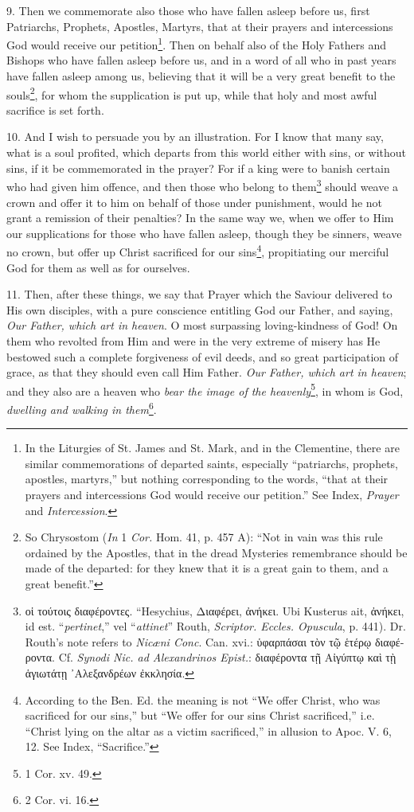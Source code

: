 9. Then we commemorate also those who have fallen asleep before us, first Patriarchs, Prophets, Apostles, Martyrs, that at their prayers and intercessions God would receive our petition\footnote{In the Liturgies of St. James and St. Mark, and in the Clementine, there are similar commemorations of departed saints, especially “patriarchs, prophets, apostles, martyrs,” but nothing corresponding to the words, “that at their prayers and intercessions God would receive our petition.” See Index, \emph{Prayer} and \emph{Intercession}.}. Then on behalf also of the Holy Fathers and Bishops who have fallen asleep before us, and in a word of all who in past years have fallen asleep among us, believing that it will be a very great benefit to the souls\footnote{So Chrysostom (\emph{In} 1 \emph{Cor.} Hom. 41, p. 457 A): “Not in vain was this rule ordained by the Apostles, that in the dread Mysteries remembrance should be made of the departed: for they knew that it is a great gain to them, and a great benefit.”}, for whom the supplication is put up, while that holy and most awful sacrifice is set forth.

10. And I wish to persuade you by an illustration. For I know that many say, what is a soul profited, which departs from this world either with sins, or without sins, if it be commemorated in the prayer? For if a king were to banish certain who had given him offence, and then those who belong to them\footnote{\textgreek{οἱ τούτοις διαφέροντες}. “Hesychius, \textgreek{Διαφέρει, ἀνήκει}. Ubi Kusterus ait, \textgreek{ἀνήκει}, id est. “\emph{pertinet},” vel “\emph{attinet}” Routh, \emph{Scriptor. Eccles. Opuscula}, p. 441). Dr. Routh’s note refers to \emph{Nicæni Conc}. Can. xvi.: \textgreek{ὑφαρπάσαι τὸν τῷ ἑτέρῳ διαφέροντα}. Cf. \emph{Synodi Nic. ad Alexandrinos Epist.}: \textgreek{διαφέροντα τῇ Αἰγύπτῳ καὶ τῂ ἁγιωτάτῃ ᾽Αλεξανδρέων ἐκκλησία}.} should weave a crown and offer it to him on behalf of those under punishment, would he not grant a remission of their penalties? In the same way we, when we offer to Him our supplications for those who have fallen asleep, though they be sinners, weave no crown, but offer up Christ sacrificed for our sins\footnote{According to the Ben. Ed. the meaning is not “We offer Christ, who was sacrificed for our sins,” but “We offer for our sins Christ sacrificed,” i.e. “Christ lying on the altar as a victim sacrificed,” in allusion to Apoc. V. 6, 12. See Index, “Sacrifice.”}, propitiating our merciful God for them as well as for ourselves.

11. Then, after these things, we say that Prayer which the Saviour delivered to His own disciples, with a pure conscience entitling God our Father, and saying, \emph{Our Father, which art in heaven}. O most surpassing loving-kindness of God! On them who revolted from Him and were in the very extreme of misery has He bestowed such a complete forgiveness of evil deeds, and so great participation of grace, as that they should even call Him Father. \emph{Our Father, which art in heaven}; and they also are a heaven who \emph{bear the image of the heavenly}\footnote{1 Cor. xv. 49.}, in whom is God, \emph{dwelling and walking in them}\footnote{2 Cor. vi. 16.}.

